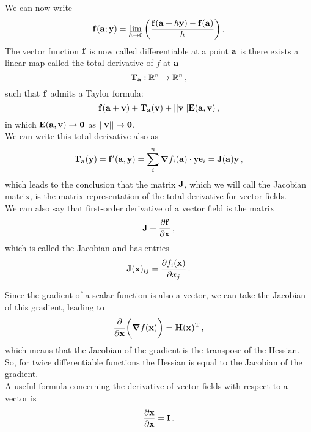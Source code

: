         We can now write
        \begin{equation}
            \vb{f}(\vb{a}; \vb{y}) = \lim_{h \to 0} \qty( \frac{\vb{f}(\vb{a} + h \vb{y}) - \vb{f}(\vb{a})}{h} ) \thinspace .
        \end{equation}
        The vector function $\vb{f}$ is now called differentiable at a point $\vb{a}$ is there exists a linear map called the total derivative of $f$ at $\vb{a}$
        \begin{equation}
            \vb{T}_{\vb{a}}: \mathbb{R}^n \to \mathbb{R}^n \thinspace ,
        \end{equation}
        such that $\vb{f}$ admits a Taylor formula:
        \begin{equation}
            \vb{f}(\vb{a} + \vb{v}) + \vb{T}_{\vb{a}}(\vb{v}) + ||\vb{v}|| \vb{E}(\vb{a}, \vb{v}) \thinspace ,
        \end{equation}
        in which $\vb{E}(\vb{a}, \vb{v}) \to \vb{0}$ as $||\vb{v}|| \to \vb{0}$. \\

        We can write this total derivative also as
        \begin{equation}
            \vb{T}_{\vb{a}} (\vb{y}) = \vb{f}'(\vb{a}, \vb{y}) = \sum_i^n \grad{f_i(\vb{a})} \cdot \vb{y} \vb{e}_i = \vb{J}(\vb{a}) \vb{y} \thinspace ,
        \end{equation}
        which leads to the conclusion that the matrix $\vb{J}$, which we will call the Jacobian matrix, is the matrix representation of the total derivative for vector fields. \\

        We can also say that first-order derivative of a vector field is the matrix
        \begin{equation}
            \vb{J} \equiv \pdv{\vb{f}}{\vb{x}} \thinspace ,
        \end{equation}
        which is called the Jacobian and has entries
        \begin{equation} \label{eq:jacobian}
            \vb{J}(\vb{x})_{ij} = \pdv{f_i(\vb{x})}{x_j} \thinspace .
        \end{equation}

        Since the gradient of a scalar function is also a vector, we can take the Jacobian of this gradient, leading to
        \begin{equation}
            \pdv{\vb{x}} \bigg( \grad{f(\vb{x})} \bigg) = \vb{H}(\vb{x})^\text{T} \thinspace ,
        \end{equation}
        which means that the Jacobian of the gradient is the transpose of the Hessian. So, for twice differentiable functions the Hessian is equal to the Jacobian of the gradient. \\

        A useful formula concerning the derivative of vector fields with respect to a vector is
        \begin{align}
            \pdv{\vb{x}}{\vb{x}} = \vb{I} \thinspace .
        \end{align}
